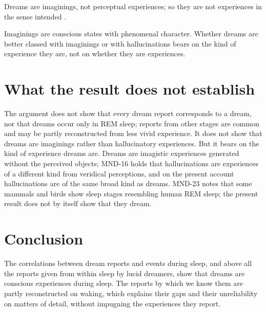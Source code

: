 \documentclass{situationist-preprint}
\begin{document}
\begin{objection}[Imagination]\label{o:imag}
Dreams are imaginings, not perceptual experiences; so they are not experiences in the sense intended \citep{Ichikawa2009}.
\end{objection}

\begin{reply}
Imaginings are conscious states with phenomenal character. Whether dreams are better classed with imaginings or with hallucinations bears on the kind of experience they are, not on whether they are experiences.
\end{reply}

\section{What the result does not establish}

The argument does not show that every dream report corresponds to a dream, nor that dreams occur only in REM sleep; reports from other stages are common and may be partly reconstructed from less vivid experience. It does not show that dreams are imaginings rather than hallucinatory experiences. But it bears on the kind of experience dreams are. Dreams are imagistic experiences generated without the perceived objects; MND-16 holds that hallucinations are experiences of a different kind from veridical perceptions, and on the present account hallucinations are of the same broad kind as dreams. MND-23 notes that some mammals and birds show sleep stages resembling human REM sleep; the present result does not by itself show that they dream.

\section{Conclusion}

The correlations between dream reports and events during sleep, and above all the reports given from within sleep by lucid dreamers, show that dreams are conscious experiences during sleep. The reports by which we know them are partly reconstructed on waking, which explains their gaps and their unreliability on matters of detail, without impugning the experiences they report.
\end{document}
